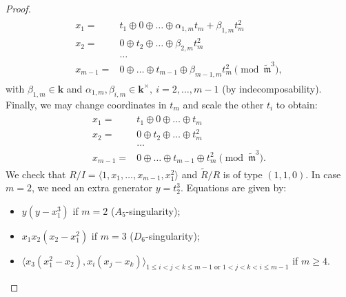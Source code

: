 \documentclass[11pt]{amsart}
\renewcommand{\k}{\mathbf k}
\newcommand{\tR}{\widetilde{R}}
\newcommand{\tm}{\widetilde{\mathfrak m}}
\theoremstyle{plain}
\theoremstyle{definition}
\begin{document}
\begin{proof}
\begin{align}
\begin{split}
  x_1= & t_1\oplus0\oplus\ldots\oplus\alpha_{1,m}t_m+\beta_{1,m}t_m^2\\
  x_2= & 0\oplus t_2\oplus\ldots\oplus\beta_{2,m}t_m^2\\
  &\ldots\\
  x_{m-1}= & 0\oplus\ldots\oplus t_{m-1}\oplus \beta_{m-1,m}t_m^2 \pmod{\tm^3},
 \end{split}
 \end{align}
 with $\beta_{1,m}\in\k$ and $\alpha_{1,m},\beta_{i,m}\in\k^\times,\ i=2,\ldots,m-1$ (by indecomposability). Finally, we may change coordinates in $t_m$ and scale the other $t_i$ to obtain:
 \begin{align}\label{coordII}
 \begin{split}
  x_1= & t_1\oplus0\oplus\ldots\oplus t_m\\
  x_2= & 0\oplus t_2\oplus\ldots\oplus t_m^2\\
  &\ldots\\
  x_{m-1}= & 0\oplus\ldots\oplus t_{m-1}\oplus t_m^2\pmod{\tm^3}.
 \end{split}
 \end{align}
 We check that $R/I=\langle 1,x_1,\ldots,x_{m-1},x_1^2\rangle$ and $\tR/R$ is of type $(1,1,0)$. In case $m=2$, we need an extra generator $y=t_2^3$. Equations are given by:
 \begin{itemize}
  \item $y(y-x_1^3)$ if $m=2$ ($A_5$-singularity);
  \item $x_1x_2(x_2-x_1^2)$ if $m=3$ ($D_6$-singularity);
  \item $\langle x_3(x_1^2-x_2),x_i(x_j-x_k)\rangle_{1\leq i<j<k\leq m-1 \text{ or }1<j<k<i\leq m-1}$ if $m\geq 4$.
 \end{itemize}

 \smallskip
 

\end{proof}
\end{document}
